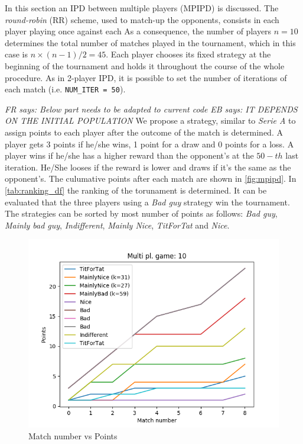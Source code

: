 \documentclass[journal,a4paper,10pt,twoside]{IEEEtran}
\newcommand{\EB}[1]{\textit{\color{blue}EB says: #1}}
\newcommand{\FR}[1]{\textit{\color{ForestGreen}FR says: #1}}
\begin{document}
In this section an IPD between multiple players (MPIPD) is discussed.
The \textit{round-robin} (RR) scheme, used to match-up the opponents, consists in each player playing once against each As a consequence, the number of players $n = 10$ determines the total number of matches played in the tournament, which in this case is ${n \times (n-1)}/{2} = 45$.
Each player chooses its fixed strategy at the beginning of the tournament and holds it throughout the course of the whole procedure.
As in 2-player IPD, it is possible to set the number of iterations of each match (i.e. \texttt{NUM\_ITER = 50}).

\FR{Below part needs to be adapted to current code}
\EB{IT DEPENDS ON THE INITIAL POPULATION}
We propose a strategy, similar to \textit{Serie A} to assign points to each player after the outcome of the match is determined. A player gets 3 points if he/she wins, 1 point for a draw and 0 points for a loss. A player wins if he/she has a higher reward than the opponent's at the $50-th$ last iteration. He/She looses if the reward is lower and draws if it's the same as the opponent's.
The culumative points after each match are shown in \autoref{fig:mpipd}.
In \autoref{tab:ranking_df} the ranking of the torunament is determined. It can be evaluated that the three players using a \textit{Bad guy} strategy win the tournament.
The strategies can be sorted by most number of points as follows: \textit{Bad guy}, \textit{Mainly bad guy}, \textit{Indifferent}, \textit{Mainly Nice}, \textit{TitForTat} and \textit{Nice}.

\begin{figure}[ht]
    \centering
    \includegraphics[width=1\columnwidth]{../img_v1/idpmp-scores-10.png}
    \caption{Match number vs Points}
    \label{fig:mpipd}
\end{figure}
\end{document}
